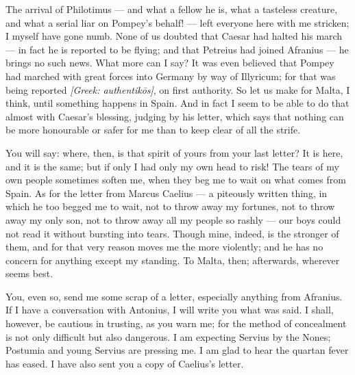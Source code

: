 

 The arrival of Philotimus --- and what a fellow he is, what a tasteless creature, and what a serial liar on Pompey's behalf! --- left everyone here with me stricken; I myself have gone numb. None of us doubted that Caesar had halted his march --- in fact he is reported to be flying; and that Petreius had joined Afranius --- he brings no such news. What more can I say? It was even believed that Pompey had marched with great forces into Germany by way of Illyricum; for that was being reported \textit{[Greek: authentik\=os]}, on first authority. So let us make for Malta, I think, until something happens in Spain. And in fact I seem to be able to do that almost with Caesar's blessing, judging by his letter, which says that nothing can be more honourable or safer for me than to keep clear of all the strife.

 You will say: where, then, is that spirit of yours from your last letter? It is here, and it is the same; but if only I had only my own head to risk! The tears of my own people sometimes soften me, when they beg me to wait on what comes from Spain. As for the letter from Marcus Caelius --- a piteously written thing, in which he too begged me to wait, not to throw away my fortunes, not to throw away my only son, not to throw away all my people so rashly --- our boys could not read it without bursting into tears. Though mine, indeed, is the stronger of them, and for that very reason moves me the more violently; and he has no concern for anything except my standing. To Malta, then; afterwards, wherever seems best.

 You, even so, send me some scrap of a letter, especially anything from Afranius. If I have a conversation with Antonius, I will write you what was said. I shall, however, be cautious in trusting, as you warn me; for the method of concealment is not only difficult but also dangerous. I am expecting Servius by the Nones; Postumia and young Servius are pressing me. I am glad to hear the quartan fever has eased. I have also sent you a copy of Caelius's letter.
